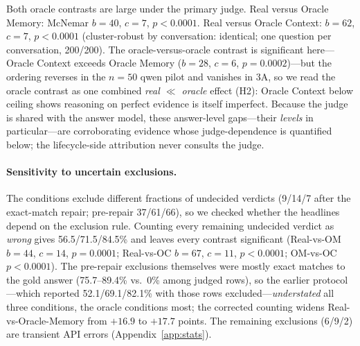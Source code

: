 \documentclass[11pt]{article}
\begin{document}
Both oracle contrasts are large under the primary judge. Real versus Oracle Memory:
McNemar $b{=}40$, $c{=}7$, $p{<}0.0001$. Real versus Oracle Context:
$b{=}62$, $c{=}7$, $p{<}0.0001$ (cluster-robust by conversation:
identical; one question per conversation, 200/200). The
oracle-versus-oracle contrast is significant
here---Oracle Context exceeds Oracle Memory ($b{=}28$, $c{=}6$,
$p{=}0.0002$)---but the ordering reverses in the $n{=}50$ qwen pilot
and vanishes in 3A, so we read the oracle contrast as one combined
\emph{real $\ll$ oracle} effect (H2): Oracle Context below ceiling shows
reasoning on perfect evidence is itself imperfect. Because the judge is
shared with the answer model, these answer-level gaps---their
\emph{levels} in particular---are corroborating evidence whose
judge-dependence is quantified below; the lifecycle-side attribution
never consults the judge.

\paragraph{Sensitivity to uncertain exclusions.}
The conditions exclude different fractions of undecided verdicts
(9/14/7 after the exact-match repair; pre-repair 37/61/66), so we
checked whether the headlines depend on the exclusion rule. Counting
every remaining undecided verdict as \emph{wrong} gives 56.5/71.5/84.5\%
and leaves every contrast significant (Real-vs-OM $b{=}44$, $c{=}14$,
$p{=}0.0001$; Real-vs-OC $b{=}67$, $c{=}11$, $p{<}0.0001$; OM-vs-OC
$p{<}0.0001$). The pre-repair exclusions themselves were mostly exact
matches to the gold answer (75.7--89.4\% vs.\ 0\% among judged rows),
so the earlier protocol---which reported 52.1/69.1/82.1\% with those
rows excluded---\emph{understated} all three conditions, the oracle
conditions most; the corrected counting widens Real-vs-Oracle-Memory
from $+16.9$ to $+17.7$ points. The remaining exclusions (6/9/2) are
transient API errors (Appendix~\ref{app:stats}).
\end{document}
